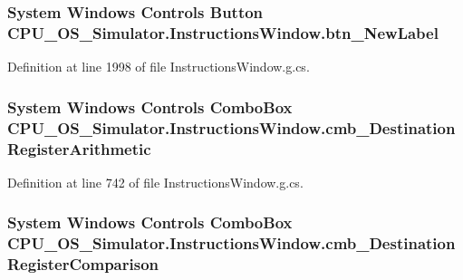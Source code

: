 \subsubsection[{btn\+\_\+\+New\+Label}]{\setlength{\rightskip}{0pt plus 5cm}System Windows Controls Button C\+P\+U\+\_\+\+O\+S\+\_\+\+Simulator.\+Instructions\+Window.\+btn\+\_\+\+New\+Label\hspace{0.3cm}{\ttfamily [package]}}\label{class_c_p_u___o_s___simulator_1_1_instructions_window_a58adb73d7a596c7e1e922a4657e32009}


Definition at line 1998 of file Instructions\+Window.\+g.\+cs.

\hypertarget{class_c_p_u___o_s___simulator_1_1_instructions_window_ad1fafd2bef9ad3f94fab585ea58fc38c}{}
\subsubsection[{cmb\+\_\+\+Destination\+Register\+Arithmetic}]{\setlength{\rightskip}{0pt plus 5cm}System Windows Controls Combo\+Box C\+P\+U\+\_\+\+O\+S\+\_\+\+Simulator.\+Instructions\+Window.\+cmb\+\_\+\+Destination\+Register\+Arithmetic\hspace{0.3cm}{\ttfamily [package]}}\label{class_c_p_u___o_s___simulator_1_1_instructions_window_ad1fafd2bef9ad3f94fab585ea58fc38c}


Definition at line 742 of file Instructions\+Window.\+g.\+cs.

\hypertarget{class_c_p_u___o_s___simulator_1_1_instructions_window_af209ebdcd0b9ae6c267388b382dac245}{}
\subsubsection[{cmb\+\_\+\+Destination\+Register\+Comparison}]{\setlength{\rightskip}{0pt plus 5cm}System Windows Controls Combo\+Box C\+P\+U\+\_\+\+O\+S\+\_\+\+Simulator.\+Instructions\+Window.\+cmb\+\_\+\+Destination\+Register\+Comparison\hspace{0.3cm}{\ttfamily [package]}}\label{class_c_p_u___o_s___simulator_1_1_instructions_window_af209ebdcd0b9ae6c267388b382dac245}


